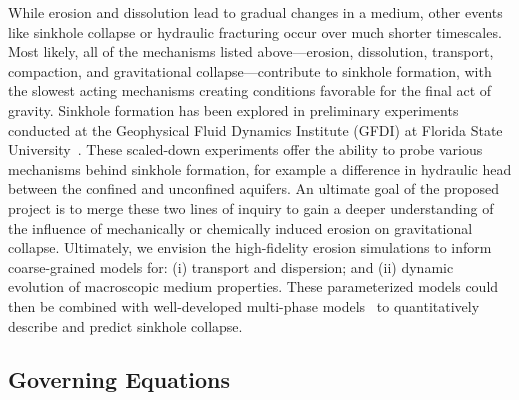 \documentclass[11pt]{article}
\begin{document}
While erosion and dissolution lead to gradual changes in a medium, other events like sinkhole collapse or hydraulic fracturing occur over much shorter timescales.  Most likely, all of the mechanisms listed above---erosion, dissolution, transport, compaction, and gravitational collapse---contribute to sinkhole formation, with the slowest acting mechanisms creating conditions favorable for the final act of gravity.  Sinkhole formation has been explored in preliminary experiments conducted at the Geophysical Fluid Dynamics Institute (GFDI) at Florida State University~\cite{tao2014experimental}. These scaled-down experiments offer the ability to probe various mechanisms behind sinkhole formation, for example a difference in hydraulic head between the confined and unconfined aquifers. An ultimate goal of the proposed project is to merge these two lines of inquiry to gain a deeper understanding of the influence of mechanically or chemically induced erosion on gravitational collapse.  Ultimately, we envision the high-fidelity erosion simulations to inform coarse-grained models for: (i) transport and dispersion; and (ii) dynamic evolution of macroscopic medium properties. These parameterized models could then be combined with well-developed multi-phase models~\cite{Imma2019, eastham2019multiphase} to quantitatively describe and predict sinkhole collapse.



\subsection{Governing Equations}
\end{document}
